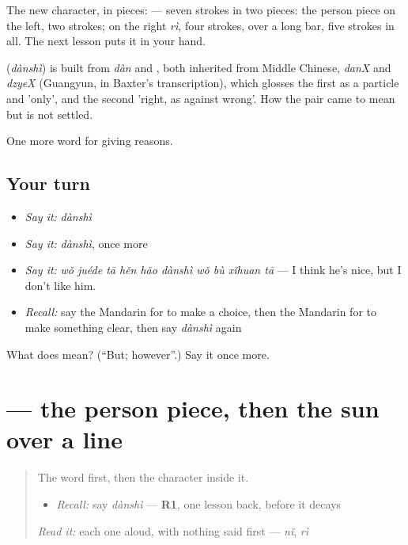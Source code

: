 The new character, in pieces:  — seven strokes in two pieces: the person piece on the left, two strokes; on the right  \emph{rì}, four strokes, over a long bar, five strokes in all. The next lesson puts it in your hand.

\begin{cousinweb}
\textbf{} (\emph{dànshì}) is built from \emph{dàn} and , both inherited from Middle Chinese, \emph{danX} and \emph{dzyeX} (Guangyun, in Baxter's transcription), which glosses the first as a particle and 'only', and the second 'right, as against wrong'. How the pair came to mean but is not settled.
\end{cousinweb}

\begin{grammarlens}[title={What you've built}]
One more word for giving reasons.
\end{grammarlens}

\subsection*{Your turn}
\begin{itemize}
\raggedright
  \item \emph{Say it:} \emph{dànshì}
  \item \emph{Say it:} \emph{dànshì}, once more
  \item \emph{Say it:} \emph{wǒ juéde tā hěn hǎo dànshì wǒ bù xǐhuan tā} — I think he's nice, but I don't like him.
  \item \emph{Recall:} say the Mandarin for to make a choice, then the Mandarin for to make something clear, then say \emph{dànshì} again
\end{itemize}

\begin{tcolorbox}[breakable,colback=teal!4,colframe=teal!35!black,title={Before you move on}]
What does  mean? (\textquotedblleft{}But; however\textquotedblright{}.) Say it once more.
\end{tcolorbox}
\section[\texorpdfstring{\zh{但} (dàn)}{但 (dàn)}]{ — the person piece, then the sun over a line}

\label{lesson:ZH-W369-dan-but}



\begin{quote}
The word first, then the character inside it.

\begin{itemize}
\raggedright
  \item \emph{Recall:} say \emph{dànshì} — \textbf{R1}, one lesson back, before it decays
\end{itemize}

\begin{quote}
 
\end{quote}

\emph{Read it:} each one aloud, with nothing said first — \emph{nǐ}, \emph{rì}
\end{quote}

